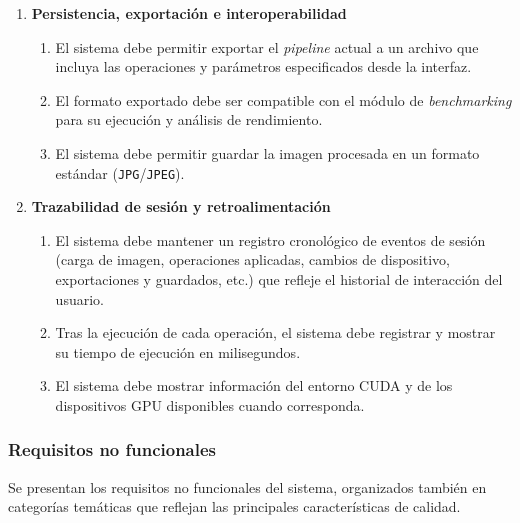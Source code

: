 \begin{enumerate}
	\vspace{0.5em}

	\item \textbf{Persistencia, exportación e interoperabilidad}\label{req:rf-7}
	\begin{enumerate}
		\item[7.1.] El sistema debe permitir exportar el \textit{pipeline} actual a un archivo que incluya las operaciones y parámetros especificados desde la interfaz.\label{req:rf-7-1}
		\item[7.2.] El formato exportado debe ser compatible con el módulo de \textit{benchmarking} para su ejecución y análisis de rendimiento.\label{req:rf-7-2}
		\item[7.3.] El sistema debe permitir guardar la imagen procesada en un formato estándar (\texttt{JPG}/\texttt{JPEG}).\label{req:rf-7-3}
	\end{enumerate}

	\vspace{0.5em}

	\item \textbf{Trazabilidad de sesión y retroalimentación}\label{req:rf-8}
	\begin{enumerate}
		\item[8.1.] El sistema debe mantener un registro cronológico de eventos de sesión (carga de imagen, operaciones aplicadas, cambios de dispositivo, exportaciones y guardados, etc.)
		que refleje el historial de interacción del usuario.\label{req:rf-8-1}
		\item[8.2.] Tras la ejecución de cada operación, el sistema debe registrar y mostrar su tiempo de ejecución en milisegundos.\label{req:rf-8-2}
		\item[8.3.] El sistema debe mostrar información del entorno CUDA y de los dispositivos GPU disponibles cuando corresponda.\label{req:rf-8-3}
	\end{enumerate}
\end{enumerate}

\newpage

\subsubsection{Requisitos no funcionales} \label{subsubsec:6_1_2_requisitos_no_funcionales}
Se presentan los requisitos no funcionales del sistema, organizados también en categorías temáticas que reflejan las principales características de calidad.

\vspace{0.5em}

